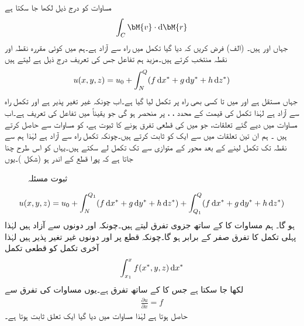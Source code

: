 مساوات  کو درج ذیل لکھا جا سکتا ہے
\begin{align}
\int_C \bM{v}\cdot \dif \bM{r}
\end{align}
جہاں  اور  ہیں۔
(الف) فرض کریں کہ دیا گیا تکمل  میں راہ  سے آزاد ہے۔ہم   میں کوئی مقررہ نقطہ  اور نقطہ  منتخب کرتے ہیں۔مزید ہم تفاعل  جس کی تعریف درج ذیل ہے لیتے ہیں
\begin{align}\label{مساوات_خطی_تکمل_آزادی_راہ_ثبوت_الف}
u(x,y,z)=u_0+\int_N^Q (f\dif x^*+g\dif y^*+h\dif z^*)
\end{align}
جہاں  مستقل ہے اور  میں  تا  کسی بھی راہ پر تکمل لیا گیا ہے۔اب چونکہ  غیر تغیر پذیر ہے اور تکمل راہ سے آزاد ہے لہٰذا تکمل کی قیمت  کے  محدد ، ،  پر منحصر ہو گی جو یقیناً  میں تفاعل   کی تعریف ہے۔اب   مساوات  میں دیے گئے تعلقات، جو  میں  کی قطعی تفرق ہونے کا ثبوت ہے،  کو مساوات  سے  حاصل کرتے ہیں ۔ ہم ان تین تعلقات  میں سے ایک کو ثابت کرتے ہیں۔چونکہ تکمل راہ سے آزاد ہے لہٰذا ہم  سے نقطہ  تک تکمل لینے کے بعد محور  کے متوازی  سے  تک تکمل لے سکتے ہیں۔یہاں  کو اس طرح چنا جاتا ہے کہ پورا  قطع  کے اندر ہو (شکل )۔یوں 
\begin{figure}
\centering
{}
\caption{ثبوت مسئلہ }
\label{شکل_مسئلہ_خطی_تکمل_آزادی_راہ}
\end{figure}
%
\begin{align}\label{مساوات_خطی_تکمل_آزادی_راہ_ثبوت_ب}
u(x,y,z)=u_0+\int_N^{Q_1}(f\dif x^*+g\dif y^*+h\dif z^*)+\int_{Q_1}^Q(f\dif x^*+g\dif y^*+h\dif z^*)
\end{align}
ہو گا۔ ہم مساوات  کا  کے ساتھ جزوی تفرق لیتے ہیں۔چونکہ  اور  دونوں  سے آزاد ہیں لہٰذا پہلی تکمل کا تفرق صفر کے برابر ہو گا۔چونکہ قطع  پر  اور  دونوں غیر تغیر پذیر ہیں لہٰذا آخری تکمل کو قطعی تکمل
\begin{align*}
\int_{x_1}^{x}f(x^*,y,z)\dif x^*
\end{align*}
لکھا جا سکتا ہے جس کا  کے ساتھ تفرق  ہے۔یوں مساوات  کی تفرق سے
\begin{align*}
\frac{\partial u}{\partial x}=f
\end{align*}
 حاصل ہوتا ہے لہٰذا مساوات  میں دیا گیا ایک تعلق ثابت ہوتا ہے۔

